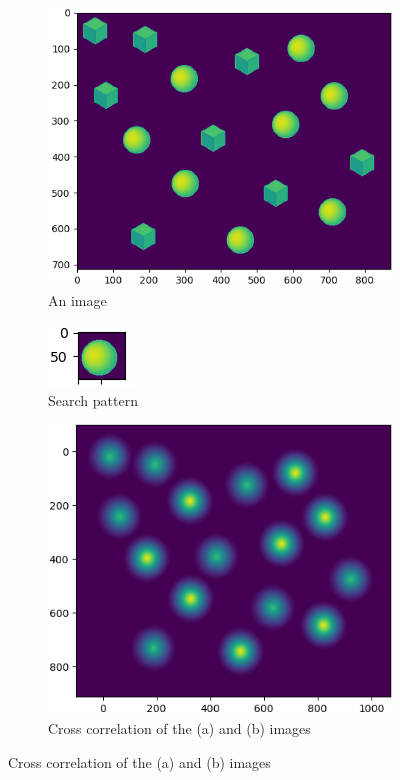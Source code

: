 \begin{figure}
	\centering
		\begin{subfigure}{.4\textwidth}
		\centering
		\includegraphics[width=\linewidth]{img/shapes}
		\caption{An image}
		\label{roi-shifts:initial}
	\end{subfigure}
	\begin{subfigure}{.4\textwidth}
	\centering
	\includegraphics[width=0.4\linewidth]{img/search_shape}
	\caption{Search pattern}
	\label{fig:sub2}
	\end{subfigure}
	\begin{subfigure}{.5\textwidth}
		\centering
		\includegraphics[width=\linewidth]{img/shapes_correlated}
		\caption{Cross correlation of the (a) and (b) images}
		\label{2d-correlation-example-result}
	\end{subfigure}
	

\end{figure}

